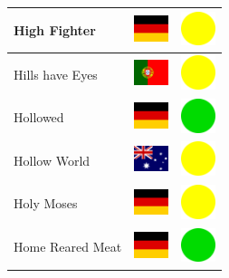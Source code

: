 \documentclass[12pt, a4paper, twoside]{report}
\begin{document}
\begin{center}
\begin{longtable}{|p{5cm}|p{2cm}|p{2cm}|}
 High Fighter                                               & \includegraphics[width=1cm]{../4x3/de} &   \includegraphics[width=1cm]{../likes/m} \\ \hline
 Hills have Eyes                                            & \includegraphics[width=1cm]{../4x3/pt} &   \includegraphics[width=1cm]{../likes/m} \\ \hline
 Hollowed                                                   & \includegraphics[width=1cm]{../4x3/de} &   \includegraphics[width=1cm]{../likes/y} \\ \hline
 Hollow World                                               & \includegraphics[width=1cm]{../4x3/au} &   \includegraphics[width=1cm]{../likes/m} \\ \hline
 Holy Moses                                                 & \includegraphics[width=1cm]{../4x3/de} &   \includegraphics[width=1cm]{../likes/m} \\ \hline
 Home Reared Meat                                           & \includegraphics[width=1cm]{../4x3/de} &   \includegraphics[width=1cm]{../likes/y} \\ \hline

\end{longtable}
\end{center}
\end{document}
